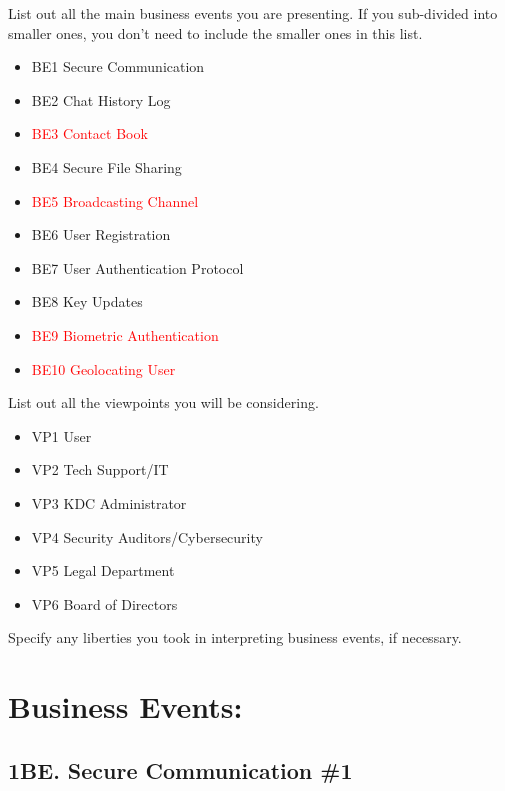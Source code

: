 \documentclass[]{article}
\begin{document}
 List out all the main business events you are presenting. If you sub-divided into smaller ones, you don't need to include the smaller ones in this list.\\

\begin{itemize}
	\item BE1 Secure Communication
	\item BE2 Chat History Log
	\item[\textcolor{red}{\textbullet}] \textcolor{red}{BE3 Contact Book}
	\item BE4 Secure File Sharing
	\item[\textcolor{red}{\textbullet}] \textcolor{red}{BE5 Broadcasting Channel}
	\item BE6 User Registration
	\item BE7 User Authentication Protocol
	\item BE8 Key Updates
	\item[\textcolor{red}{\textbullet}] \textcolor{red}{BE9 Biometric Authentication}
	\item[\textcolor{red}{\textbullet}] \textcolor{red}{BE10 Geolocating User}

\end{itemize}

 List out all the viewpoints you will be considering.\\

\begin{itemize}
	\item VP1 User
	\item 	VP2 Tech Support/IT
	\item 	VP3 KDC Administrator
	\item 	VP4 Security Auditors/Cybersecurity
	\item 	VP5 Legal Department
	\item 	VP6 Board of Directors


\end{itemize}

 Specify any liberties you took in interpreting business events, if necessary.\\

\section*{Business Events:}
\subsection*{1BE. Secure Communication \#1}
\end{document}
